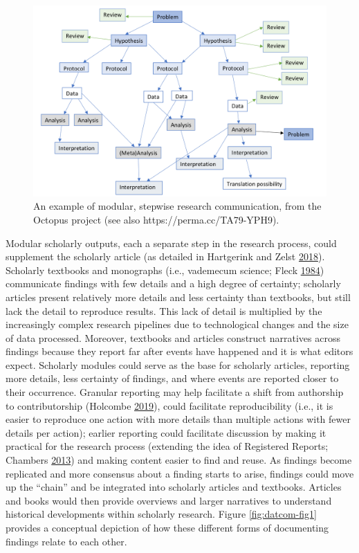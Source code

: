 \documentclass[a5paper]{book}
\begin{document}
\begin{figure}[h]
\includegraphics[width=1\linewidth]{assets/figures/fig-octo} \caption{An example of modular, stepwise research communication, from the Octopus project (see also https://perma.cc/TA79-YPH9).}\label{fig:octopi}
\end{figure}

Modular scholarly outputs, each a separate step in the research process,
could supplement the scholarly article (as detailed in Hartgerink and
Zelst \protect\hyperlink{ref-doi:10.3390ux2fpublications6020021}{2018}).
Scholarly textbooks and monographs (i.e., vademecum science; Fleck
\protect\hyperlink{ref-isbn:9780226253251}{1984}) communicate findings
with few details and a high degree of certainty; scholarly articles
present relatively more details and less certainty than textbooks, but
still lack the detail to reproduce results. This lack of detail is
multiplied by the increasingly complex research pipelines due to
technological changes and the size of data processed. Moreover,
textbooks and articles construct narratives across findings because they
report far after events have happened and it is what editors expect.
Scholarly modules could serve as the base for scholarly articles,
reporting more details, less certainty of findings, and where events are
reported closer to their occurrence. Granular reporting may help
facilitate a shift from authorship to contributorship (Holcombe
\protect\hyperlink{ref-doi:10.31234ux2fosf.ioux2fdt6e8}{2019}), could
facilitate reproducibility (i.e., it is easier to reproduce one action
with more details than multiple actions with fewer details per action);
earlier reporting could facilitate discussion by making it practical for
the research process (extending the idea of Registered Reports; Chambers
\protect\hyperlink{ref-doi:10.1016ux2fj.cortex.2012.12.016}{2013}) and
making content easier to find and reuse. As findings become replicated
and more consensus about a finding starts to arise, findings could move
up the \enquote{chain} and be integrated into scholarly articles and
textbooks. Articles and books would then provide overviews and larger
narratives to understand historical developments within scholarly
research. Figure \ref{fig:datcom-fig1} provides a conceptual depiction
of how these different forms of documenting findings relate to each
other.
\end{document}

